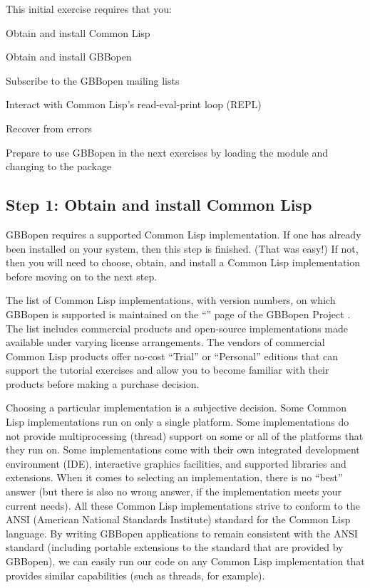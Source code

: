 \documentclass[10pt,twoside,english,pdftex]{article}
\begin{document}
This initial exercise requires that you:
\begin{tightitemize}
\item Obtain and install Common Lisp
\item Obtain and install GBBopen
\item Subscribe to the GBBopen mailing lists
\item Interact with Common Lisp's read-eval-print loop (REPL)
\item Recover from errors
\item Prepare to use GBBopen in the next exercises by loading the
   module and changing to the
   package
\end{tightitemize}

\fndocrule

\subsection*{Step 1: Obtain and install Common Lisp}

%
GBBopen requires a supported Common Lisp implementation.  If one has already
been installed on your system, then this step is finished.  (That was easy!)
If not, then you will need to choose, obtain, and install a Common Lisp
implementation before moving on to the next step.

The list of Common Lisp implementations, with version numbers, on which
GBBopen is supported is maintained on the ``'' page of the GBBopen Project
.  The list includes commercial
products and open-source implementations made available under varying license
arrangements.  The vendors of commercial Common Lisp products offer no-cost
``Trial'' or ``Personal'' editions that can support the tutorial exercises and
allow you to become familiar with their products before making a purchase
decision.

Choosing a particular implementation is a subjective decision.  Some Common
Lisp implementations run on only a single platform.  Some implementations do
not provide multiprocessing (thread) support on some or all of the platforms
that they run on.  Some implementations come with their own integrated
development environment (IDE), interactive graphics facilities, and supported
libraries and extensions.  When it comes to selecting an implementation, there
is no ``best'' answer (but there is also no wrong answer, if the
implementation meets your current needs).  All these Common Lisp
implementations strive to conform to the ANSI (American National Standards
Institute) standard for the Common Lisp language.  By writing GBBopen
applications to remain consistent with the ANSI standard (including portable
extensions to the standard that are provided by GBBopen), we can easily run
our code on any Common Lisp implementation that provides similar capabilities
(such as threads, for example).
\end{document}
